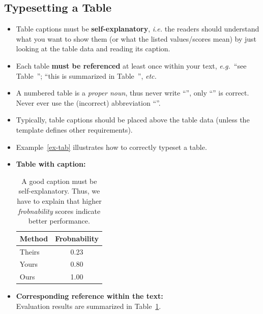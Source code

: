 \documentclass[11pt,a4paper]{article}
\begin{document}
\subsection{Typesetting a Table}
\noindent
\begin{itemize}
 \item Table captions must be \textbf{self-explanatory}, \emph{i.e.} the readers should understand what you want to show them (or what the listed values/scores mean) by just looking at the table data and reading its caption.
 
 \item Each table \textbf{must be referenced} at least once within your text, \emph{e.g.}~``see Table~''; ``this is summarized in Table~'', \emph{etc.}
 
 \item A numbered table is a \emph{proper noun}, thus never write ``'', only ``'' is correct. Never ever use the (incorrect) abbreviation ``''.
 
 \item Typically, table captions should be placed above the table data (unless the template defines other requirements).
 
 \item Example~\ref{ex-tab} illustrates how to correctly typeset a table.
\end{itemize}
% 
% 
\begin{texexample}
  \label{ex-tab}
  \begin{itemize}[leftmargin=1em]
  \item \textbf{Table with caption:}
  \begin{table}[H]
    \centering
    \caption{A good caption must be self-explanatory. Thus, we have to explain that higher \emph{frobnability} scores indicate better performance.}
    \label{tab-example1}
    \begin{tabular}{l|c}
      \hline
      \textbf{Method} & \textbf{Frobnability}\\\hline
      Theirs & 0.23 \\
      Yours  & 0.80 \\
      Ours   & 1.00 \\\hline
    \end{tabular}
  \end{table}
  \vspace{-0.5em}
  
  \item\textbf{Corresponding reference within the text:}\\
  Evaluation results are summarized in Table~\ref{tab-example1}.
  \end{itemize}
    
\end{texexample}
\end{document}
